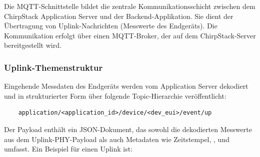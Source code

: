 \begin{center}
\end{center}
Die MQTT-Schnittstelle bildet die zentrale Kommunikationsschicht zwischen dem ChirpStack Application Server und der Backend-Applikation. Sie dient der Übertragung von Uplink-Nachrichten (Messwerte des Endgeräts). Die Kommunikation erfolgt über einen MQTT-Broker, der auf dem ChirpStack-Server bereitgestellt wird.

\subsubsection{Uplink-Themenstruktur}
Eingehende Messdaten des Endgeräts werden vom Application Server dekodiert und in strukturierter Form über folgende Topic-Hierarchie veröffentlicht:

\begin{verbatim}
	application/<application_id>/device/<dev_eui>/event/up
\end{verbatim}

Der Payload enthält ein JSON-Dokument, das sowohl die dekodierten Messwerte aus dem Uplink-PHY-Payload als auch Metadaten wie Zeitstempel, ,  und  umfasst. Ein Beispiel für einen Uplink ist:

